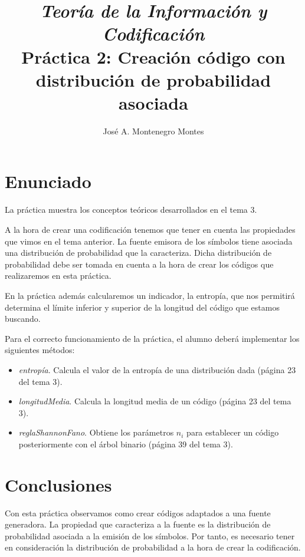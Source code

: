 \documentclass{article}
\begin{document}
\title{\textit{Teoría de la Información y Codificación}\\ \textbf{Práctica 2: Creación código con distribución de probabilidad asociada}}
\author{José A. Montenegro Montes}

\maketitle


\section{Enunciado}

La práctica muestra los conceptos teóricos desarrollados en el tema 3. 

A la hora de crear una codificación tenemos que tener en cuenta las propiedades que vimos en el tema anterior. La fuente emisora de los símbolos tiene asociada una distribución de probabilidad que la caracteriza. Dicha distribución de probabilidad debe ser tomada en cuenta a la hora de crear los códigos que realizaremos en esta práctica.

En la práctica además calcularemos un indicador, la entropía, que nos permitirá determina el límite inferior y superior de la longitud del código que estamos buscando.

Para el correcto funcionamiento de la práctica, el alumno deberá implementar los siguientes métodos: 

\begin{itemize}
\item \textit{entropía}. Calcula el valor de la entropía de una distribución dada (página 23 del tema 3).
\item \textit{longitudMedia}. Calcula la longitud media de un código (página 23 del tema 3).
\item \textit{reglaShannonFano}. Obtiene los parámetros $n_i$ para establecer un código posteriormente con el árbol binario (página 39 del tema 3). 
\end{itemize}



\section{Conclusiones}

Con esta práctica observamos como crear códigos adaptados a una fuente generadora. La propiedad que caracteriza a la fuente es la distribución de probabilidad asociada a la emisión de los símbolos. Por tanto, es necesario tener en consideración la distribución de probabilidad a la hora de crear la codificación.
\end{document}
